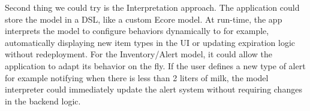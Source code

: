 Second thing we could try is the Interpretation approach. The application could store the model in a DSL, like a custom Ecore model. At run-time, the app interprets the model to configure behaviors dynamically to for example, automatically displaying new item types in the UI or updating expiration logic without redeployment. For the Inventory/Alert model, it could allow the application to adapt its behavior on the fly. If the user defines a new type of alert for example notifying when there is less than 2 liters of milk, the model interpreter could immediately update the alert system without requiring changes in the backend logic.

